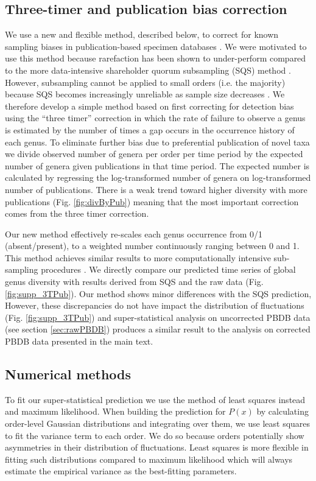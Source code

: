 \subsection{Three-timer and publication bias correction} 
\label{sec:3TP}
We use a new and flexible method, described below, to correct for
known sampling biases in publication-based specimen databases
\citep{alroy08, alroy2010}.  We were motivated to use this method
because rarefaction has been shown to under-perform compared to the
more data-intensive shareholder quorum subsampling (SQS) method
\citep{alroy2010}.  However, subsampling cannot be applied to small
orders (i.e. the majority) because SQS becomes increasingly unreliable
as sample size decreases \citep{alroy2010}.  We therefore develop a
simple method based on first correcting for detection bias using the
``three timer'' correction \citep{alroy08} in which the rate of failure
to observe a genus is estimated by the number of times a gap occurs in
the occurrence history of each genus. To eliminate further bias due to
preferential publication of novel taxa we divide observed number of
genera per order per time period by the expected number of genera
given publications in that time period.  The expected number is
calculated by regressing the log-transformed number of genera on
log-transformed number of publications. There is a weak trend toward
higher diversity with more publications (Fig. \ref{fig:divByPub})
meaning that the most important correction comes from the three timer
correction.

Our new method effectively re-scales each genus occurrence from 0/1
(absent/present), to a weighted number continuously ranging between 0
and 1.  This method achieves similar results to more computationally
intensive sub-sampling procedures \citep{alroy08, alroy2010}. We
directly compare our predicted time series of global genus diversity
with results derived from SQS \citep{alroy2010} and the raw data
(Fig. \ref{fig:supp_3TPub}).  Our method shows minor differences with
the SQS prediction, However, these discrepancies do not have impact
the distribution of fluctuations (Fig. \ref{fig:supp_3TPub}) and
super-statistical analysis on uncorrected PBDB data (see section
\ref{sec:rawPBDB}) produces a similar result to the analysis on
corrected PBDB data presented in the main text.

\subsection{Numerical methods} \label{sec:numMeth} To fit our
super-statistical prediction we use the method of least squares
instead and maximum likelihood. When building the prediction for
$P(x)$ by calculating order-level Gaussian distributions and
integrating over them, we use least squares to fit the variance term
to each order. We do so because orders potentially show asymmetries in
their distribution of fluctuations. Least squares is more flexible in
fitting such distributions compared to maximum likelihood which will
always estimate the empirical variance as the best-fitting parameters.

